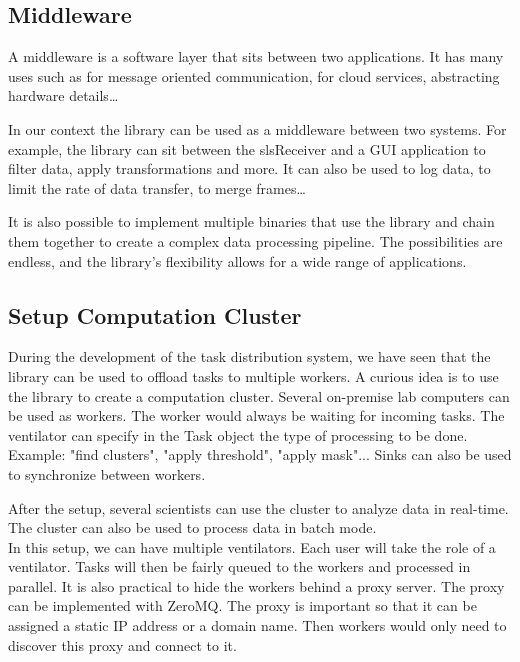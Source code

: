\begin{spacing}{1.2}
    \subsection{Middleware}

    A middleware is a software layer that sits between two applications. It has many uses such as
    for message oriented communication, for cloud services, abstracting hardware details\dots

    In our context the library can be used as a middleware between two systems. For example,
    the library can sit between the slsReceiver and a GUI application to filter data, apply transformations
    and more. It can also be used to log data, to limit the rate of data transfer, to merge frames\dots

    It is also possible to implement multiple binaries that use the library and chain them together
    to create a complex data processing pipeline. The possibilities are endless, and the library's
    flexibility allows for a wide range of applications.


    \subsection{Setup Computation Cluster}
    During the development of the task distribution system, we have seen that the library can be used
    to offload tasks to multiple workers. A curious idea is to use the library to create a computation
    cluster. Several on-premise lab computers can be used as workers. The worker would always be waiting
    for incoming tasks. The ventilator can specify in the Task object the type of processing to be done.
    Example: "find clusters", "apply threshold", "apply mask"... Sinks can also be used to synchronize
    between workers.

    After the setup, several scientists can use the cluster to analyze data in real-time.
    The cluster can also be used to process data in batch mode.\\

    In this setup, we can have multiple ventilators. Each user will take the role of a ventilator.
    Tasks will then be fairly queued to the workers and processed in parallel. It is also 
    practical to hide the workers behind a proxy server. The proxy can be implemented 
    with ZeroMQ. The proxy is important so that it can be assigned a static IP address or a 
    domain name. Then workers would only need to discover this proxy and connect to it.







\end{spacing}
